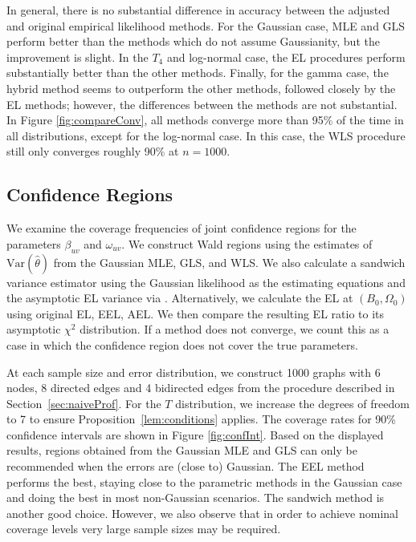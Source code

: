 \documentclass[notitlepage]{article}
\begin{document}
In general, there is no substantial difference in accuracy between the
adjusted and original empirical likelihood methods. For the Gaussian
case, MLE and GLS perform better than the methods which do not assume
Gaussianity, but the improvement is slight. In the $T_4$ and
log-normal case, the EL procedures perform substantially better than
the other methods. Finally, for the gamma case, the hybrid method
seems to outperform the other methods, followed closely by the EL
methods; however, the differences between the methods are not
substantial.
In Figure \ref{fig:compareConv}, all methods converge
more than 95\% of the time in all distributions, except for the log-normal
case. In this case, the WLS procedure still only converges roughly
90\% at $n = 1000$.

\subsection{Confidence Regions}

We examine the coverage frequencies of joint confidence regions for
the parameters $\beta_{uv}$ and $\omega_{uv}$.  We construct Wald
regions using the estimates of $\text{Var}(\hat \theta)$ from the
Gaussian MLE, GLS, and WLS. We also calculate a sandwich variance
estimator using the Gaussian likelihood as the estimating equations
and the asymptotic EL variance via \cite{qin1994empirical}.
Alternatively, we calculate the EL at $(B_0, \Omega_0)$ using original
EL, EEL, AEL. We then compare the resulting EL
ratio to its asymptotic $\chi^2$ distribution. If a method
does not converge, we count this as a case in which the confidence
region does not cover the true parameters.

At each sample size and error distribution, we construct 1000 graphs
with 6 nodes, 8 directed edges and 4 bidirected edges from the
procedure described in Section~\ref{sec:naiveProf}. For the $T$
distribution, we increase the degrees of freedom to 7 to ensure
Proposition~\ref{lem:conditions} applies. The coverage rates for 90\%
confidence intervals are shown in Figure \ref{fig:confInt}.  Based on
the displayed results, regions obtained from the Gaussian MLE and GLS
can only be recommended when the errors are (close to) Gaussian.  The
EEL method performs the best, staying close to the parametric methods
in the Gaussian case and doing the best in most non-Gaussian
scenarios.  The sandwich method is another good choice.  However, we
also observe that in order to achieve nominal coverage levels very
large sample sizes may be required.
\end{document}
